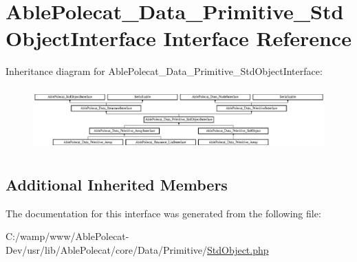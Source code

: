 \hypertarget{interface_able_polecat___data___primitive___std_object_interface}{}\section{Able\+Polecat\+\_\+\+Data\+\_\+\+Primitive\+\_\+\+Std\+Object\+Interface Interface Reference}
\label{interface_able_polecat___data___primitive___std_object_interface}
Inheritance diagram for Able\+Polecat\+\_\+\+Data\+\_\+\+Primitive\+\_\+\+Std\+Object\+Interface\+:\begin{figure}[H]
\begin{center}
\leavevmode
\includegraphics[height=2.430556cm]{interface_able_polecat___data___primitive___std_object_interface}
\end{center}
\end{figure}
\subsection*{Additional Inherited Members}


The documentation for this interface was generated from the following file\+:\begin{DoxyCompactItemize}
\item 
C\+:/wamp/www/\+Able\+Polecat-\/\+Dev/usr/lib/\+Able\+Polecat/core/\+Data/\+Primitive/\hyperlink{_std_object_8php}{Std\+Object.\+php}\end{DoxyCompactItemize}

